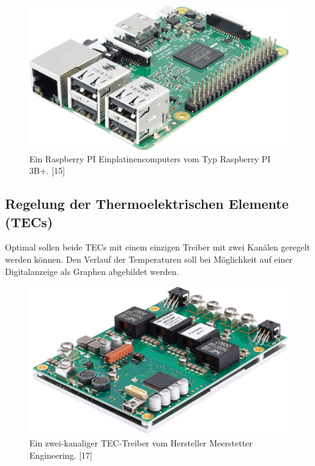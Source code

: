 \begin{figure}[H]
    \centering
    \includegraphics[scale=0.2]{98_images/raspberry_pi_version_3_b.jpg}
    \caption{Ein Raspberry PI Einplatinencomputers vom Typ Raspberry PI 3B+. [15]}
    \label{fig:raspberry_pi}
\end{figure}

\subsection{Regelung der Thermoelektrischen Elemente (TECs)}
Optimal sollen beide TECs mit einem einzigen Treiber mit zwei Kanälen geregelt werden können. Den Verlauf der Temperaturen soll bei Möglichkeit auf einer Digitalanzeige als Graphen abgebildet werden.

\begin{figure}[H]
    \centering
    \includegraphics[scale=0.25]{98_images/tec_controller_real_isometry_meerstetter.PNG}
    \caption{Ein zwei-kanaliger TEC-Treiber vom Hersteller Meerstetter Engineering. [17]}
    \label{fig:tec_controller_free}
\end{figure}

